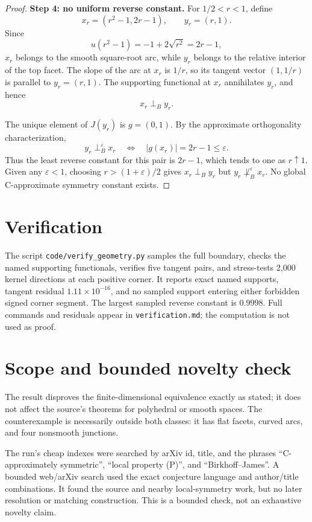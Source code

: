 \documentclass[11pt]{article}
\newcommand{\JB}{\perp_{B}}
\newcommand{\JBe}[1]{\perp_{B}^{#1}}
\begin{document}
\begin{proof}
\textbf{Step 4: no uniform reverse constant.}
For $1/2<r<1$, define
\[
 x_r=(r^2-1,2r-1),\qquad y_r=(r,1).
\]
Since
\[
 u(r^2-1)=-1+2\sqrt{r^2}=2r-1,
\]
$x_r$ belongs to the smooth square-root arc, while $y_r$ belongs to the
relative interior of the top facet.  The slope of the arc at $x_r$ is $1/r$,
so its tangent vector $(1,1/r)$ is parallel to $y_r=(r,1)$.  The supporting
functional at $x_r$ annihilates $y_r$, and hence
\[
 x_r\JB y_r.
\]

The unique element of $J(y_r)$ is $g=(0,1)$.  By the approximate
orthogonality characterization,
\[
 y_r\JBe{\varepsilon}x_r
 \quad\Longleftrightarrow\quad
 |g(x_r)|=2r-1\leq\varepsilon.
\]
Thus the least reverse constant for this pair is $2r-1$, which tends to one
as $r\uparrow1$.  Given any $\varepsilon<1$, choosing
$r>(1+\varepsilon)/2$ gives $x_r\JB y_r$ but
$y_r\not\JBe{\varepsilon}x_r$.  No global C-approximate symmetry constant
exists.
\end{proof}

\section{Verification}

The script \texttt{code/verify\_geometry.py} samples the full boundary,
checks the named supporting functionals, verifies five tangent pairs, and
stress-tests 2,000 kernel directions at each positive corner.  It reports
exact named supports, tangent residual $1.11\times10^{-16}$, and no sampled
support entering either forbidden signed corner segment.  The largest sampled
reverse constant is $0.9998$.  Full commands and residuals appear in
\texttt{verification.md}; the computation is not used as proof.

\section{Scope and bounded novelty check}

The result disproves the finite-dimensional equivalence exactly as stated; it
does not affect the source's theorems for polyhedral or smooth spaces.  The
counterexample is necessarily outside both classes: it has flat facets,
curved arcs, and four nonsmooth junctions.

The run's cheap indexes were searched by arXiv id, title, and the phrases
``C-approximately symmetric'', ``local property (P)'', and
``Birkhoff--James''.  A bounded web/arXiv search used the exact conjecture
language and author/title combinations.  It found the source and nearby
local-symmetry work, but no later resolution or matching construction.  This
is a bounded check, not an exhaustive novelty claim.
\end{document}
